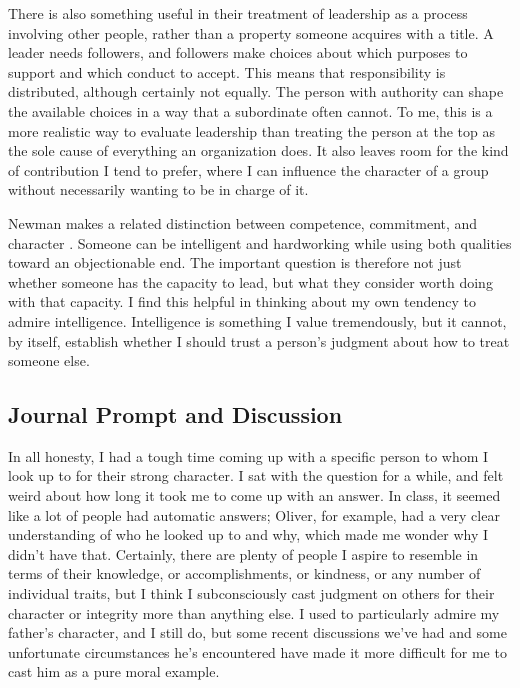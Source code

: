 \documentclass[12pt,stu,biblatex]{apa7}
\begin{document}
There is also something useful in their treatment of leadership as a process involving other people, rather than a property someone acquires with a title.
A leader needs followers, and followers make choices about which purposes to support and which conduct to accept.
This means that responsibility is distributed, although certainly not equally.
The person with authority can shape the available choices in a way that a subordinate often cannot.
To me, this is a more realistic way to evaluate leadership than treating the person at the top as the sole cause of everything an organization does.
It also leaves room for the kind of contribution I tend to prefer, where I can influence the character of a group without necessarily wanting to be in charge of it.

Newman makes a related distinction between competence, commitment, and character \parencite[ch. 1]{Newman2019building}.
Someone can be intelligent and hardworking while using both qualities toward an objectionable end.
The important question is therefore not just whether someone has the capacity to lead, but what they consider worth doing with that capacity.
I find this helpful in thinking about my own tendency to admire intelligence.
Intelligence is something I value tremendously, but it cannot, by itself, establish whether I should trust a person's judgment about how to treat someone else.

\subsection{Journal Prompt and Discussion}

In all honesty, I had a tough time coming up with a specific person to whom I look up to for their strong character.
I sat with the question for a while, and felt weird about how long it took me to come up with an answer.
In class, it seemed like a lot of people had automatic answers; Oliver, for example, had a very clear understanding of who he looked up to and why, which made me wonder why I didn't have that.
Certainly, there are plenty of people I aspire to resemble in terms of their knowledge, or accomplishments, or kindness, or any number of individual traits, but I think I subconsciously cast judgment on others for their character or integrity more than anything else.
I used to particularly admire my father's character, and I still do, but some recent discussions we've had and some unfortunate circumstances he's encountered have made it more difficult for me to cast him as a pure moral example.
\end{document}
